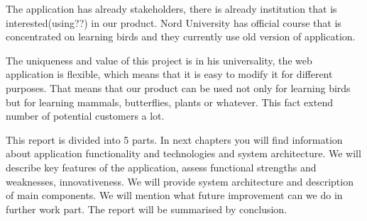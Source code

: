 \par
The application has already stakeholders, there is already institution that is interested(using??) in our product. Nord University has official course that is concentrated on learning birds and they currently use old version of application. 
\par
The uniqueness and value of this project is in his universality, the web application is flexible, which means that it is easy to modify it for different purposes. That means that our product can be used not only for learning birds but for learning mammals, butterflies, plants or whatever. This fact extend number of potential customers a lot. 
\par
This report is divided into 5 parts. In next chapters you will find information about application functionality and technologies and system architecture. We will describe key features of the application, assess functional strengths and weaknesses, innovativeness. We will provide system architecture and description of main components. We will mention what future improvement can we do in further work part. The report will be summarised by conclusion. 





   